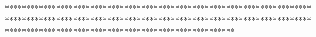 %
%
%
******************************************************************************************************************************************************************************************************